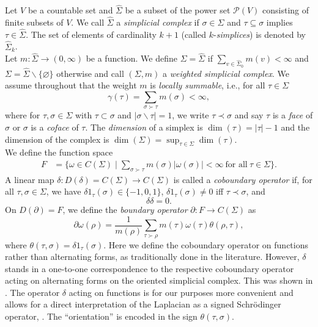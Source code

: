 \documentclass[10pt]{amsart}
\theoremstyle{definition}
\newcommand{\F}{{F}}
\begin{document}
Let $V$ be a countable set and $\hat \Sigma$ be a subset of the power set $\mathcal{P}(V)$ consisting of finite subsets of $V.$ We call $\hat \Sigma$ a \textit{simplicial complex} if $\sigma\in\hat \Sigma$ and $\tau\subseteq \sigma$ implies $\tau\in\hat \Sigma.$ The set of elements of cardinality $k+1$ (called $k$-\emph{simplices}) is denoted by $\hat \Sigma_k$. \\
Let $m:\hat{\Sigma}\rightarrow(0,\infty)$ be  a function. We define $ \Sigma = \hat \Sigma$ if $\sum_{v\in  \hat\Sigma_{0}}m(v)<\infty$ and $ \Sigma = \hat \Sigma\backslash\lbrace\varnothing\rbrace$ otherwise and call $( \Sigma,m)$ a \textit{weighted simplicial complex}. 
We assume throughout that the weight $m$ is \textit{locally summable}, i.e., for all $\tau\in \Sigma$
\[\gamma(\tau)= \sum_{\sigma\succ\tau}m(\sigma)<\infty,\]
where for $\tau,\sigma\in \Sigma$ with $\tau\subset\sigma$ and $|\sigma\backslash\tau| = 1$, we write $\tau\prec\sigma$ and say $\tau$ is a \textit{face} of $\sigma$ or $\sigma$ is a \textit{coface} of $\tau$. The \emph{dimension} of a simplex is $\dim(\tau)=|\tau|-1$ and the dimension of the complex is  $\dim(\Sigma)=\sup_{\tau\in \Sigma}\dim(\tau)$.\\
We  define the function space
\begin{align*}
\F &= \lbrace\omega\in C(\Sigma)\mid\sum_{\sigma\succ \tau}m(\sigma)|\omega(\sigma)|<\infty~\text{for all}~\tau\in \Sigma\rbrace.
\end{align*}
 A linear map $\delta:D(\delta)=C(\Sigma)\rightarrow C(\Sigma)$ is called a \textit{coboundary operator} if, for all $\tau,\sigma\in \Sigma$, we have $\delta 1_\tau(\sigma)\in\lbrace -1,0,1\rbrace$, $\delta 1_\tau(\sigma)\neq 0$ iff $\tau\prec\sigma$, and \[\delta\delta = 0.\]
On $D(\partial)=\F$, we define the \textit{boundary operator} $\partial:\F\rightarrow C(\Sigma)$ as
\[\partial\omega(\rho) = \frac{1}{m(\rho)}\sum_{\tau\succ \rho}m(\tau)\omega(\tau)\theta(\rho,\tau),\]
where $\theta(\tau,\sigma)=\delta1_\tau(\sigma)$. 
Here we define the coboundary operator on functions rather than alternating forms, as traditionally done in the literature. However, $\delta$ stands in a one-to-one correspondence to the respective coboundary operator acting on alternating forms on the oriented simplicial complex. This was shown in \cite[Subsection 2.2]{BK}. The operator $\delta$ acting on functions is for our purposes more convenient and allows for a direct interpretation of the Laplacian as a signed Schr\"odinger operator, \cite[Theorem 3.12]{BK}. The ``orientation'' is encoded in the sign $\theta(\tau,\sigma).$
\end{document}
